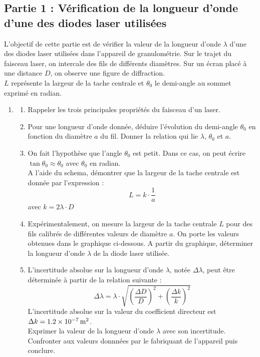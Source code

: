 \documentclass[a4paper,11pt,fleqn]{article}%
\begin{document}
    \subsection*{Partie 1 : Vérification de la longueur d'onde d'une des diodes laser utilisées}
    L'objectif de cette partie est de vérifier la valeur de la longueur d'onde $\lambda$ d'une des diodes laser utilisées dans l'appareil de granulométrie. Sur le trajet du faisceau laser, on intercale des fils de différents diamètres. Sur un écran placé à une distance $D$, on observe une figure de diffraction.\\
    $L$ représente la largeur de la tache centrale et $\theta_0$ le demi-angle au sommet exprimé en radian.

    \begin{enumerate}
        \item \begin{enumerate}
            \item Rappeler les trois principales propriétés du faisceau d'un laser.
            \item Pour une longueur d'onde donnée, déduire l'évolution du demi-angle $\theta_0$ en fonction du diamètre $a$ du fil. Donner la relation qui lie $\lambda$, $\theta_0$ et $a$.
            \item On fait l'hypothèse que l'angle $\theta_0$ est petit. Dans ce cas, on peut écrire $\tan \theta_0 \approx \theta_0$ avec $\theta_0$ en radian.\\
            A l'aide du schema, démontrer que la largeur de la tache centrale est donnée par l'expression : $$ L = k \cdot \dfrac{1}{a} $$
            avec $k =  2 \lambda \cdot D $
            \item Expérimentalement, on mesure la largeur de la tache centrale $L$ pour des fils calibrés de différentes valeurs de diamètre $a$. On porte les valeurs obtenues dans le graphique ci-dessous. A partir du graphique, déterminer la longueur d'onde $\lambda$ de la diode laser utilisée.
            \item L'incertitude absolue sur la longueur d'onde $\lambda$, notée $\Delta \lambda$, peut être déterminée à partir de la relation suivante : $$ \Delta \lambda = \lambda \cdot \sqrt{\left(\dfrac{\Delta D}{D}\right)^2 + \left(\dfrac{\Delta k}{k}\right)^2}$$
            L'incertitude absolue sur la valeur du coefficient directeur est $\Delta k = \SI{1,2E-7}{\meter\squared}$.\\
            Exprimer la valeur de la longueur d'onde $\lambda$ avec son incertitude. Confronter aux valeurs donnnées par le fabriquant de l'appareil puis conclure.
        \end{enumerate}
    \end{enumerate}
\end{document}
